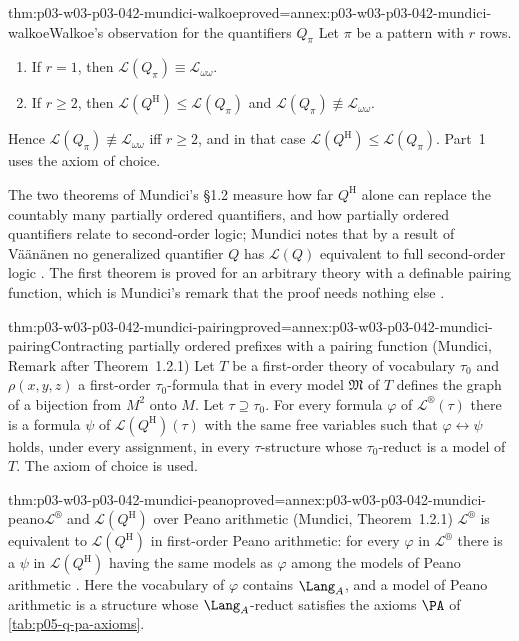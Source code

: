 \begin{hbtheorem}{thm:p03-w03-p03-042-mundici-walkoe}{proved=annex:p03-w03-p03-042-mundici-walkoe}{Walkoe's observation for the quantifiers \(Q_\pi\)}
Let \(\pi\) be a pattern with \(r\) rows.
\begin{enumerate}
\item If \(r=1\), then \(\mathscr L(Q_\pi)\equiv\mathscr L_{\omega\omega}\).
\item If \(r\geq2\), then \(\mathscr L(Q^{\mathrm H})\leq\mathscr
      L(Q_\pi)\) and \(\mathscr L(Q_\pi)\not\equiv\mathscr L_{\omega\omega}\).
\end{enumerate}
Hence \(\mathscr L(Q_\pi)\not\equiv\mathscr L_{\omega\omega}\) iff
\(r\geq2\), and in that case \(\mathscr L(Q^{\mathrm H})\leq\mathscr
L(Q_\pi)\).  Part~1 uses the axiom of choice.
\end{hbtheorem}

The two theorems of Mundici's \S1.2 measure how far \(Q^{\mathrm H}\)
alone can replace the countably many partially ordered quantifiers, and how
partially ordered quantifiers relate to second-order logic; Mundici notes
that by a result of V\"a\"an\"anen no generalized quantifier \(Q\) has
\(\mathscr L(Q)\) equivalent to full second-order logic
\cite[p.~214]{Mundici1985OtherQuantifiers}.  The first theorem is proved
for an arbitrary theory with a definable pairing function, which is
Mundici's remark that the proof needs nothing else
\cite[p.~214]{Mundici1985OtherQuantifiers}.

\begin{hbtheorem}{thm:p03-w03-p03-042-mundici-pairing}{proved=annex:p03-w03-p03-042-mundici-pairing}{Contracting partially ordered prefixes with a pairing function (Mundici, Remark after Theorem~1.2.1)}
Let \(T\) be a first-order theory of vocabulary \(\tau_0\) and
\(\rho(x,y,z)\) a first-order \(\tau_0\)-formula that in every model
\(\mathfrak M\) of \(T\) defines the graph of a bijection from \(M^2\)
onto \(M\).  Let \(\tau\supseteq\tau_0\).  For every formula \(\varphi\) of
\(\mathscr L^{\circledR}(\tau)\) there is a formula \(\psi\) of
\(\mathscr L(Q^{\mathrm H})(\tau)\) with the same free variables such that
\(\varphi\leftrightarrow\psi\) holds, under every assignment, in every
\(\tau\)-structure whose \(\tau_0\)-reduct is a model of \(T\).  The axiom
of choice is used.
\end{hbtheorem}

\begin{hbcorollary}{thm:p03-w03-p03-042-mundici-peano}{proved=annex:p03-w03-p03-042-mundici-peano}{\(\mathscr L^{\circledR}\) and \(\mathscr L(Q^{\mathrm H})\) over Peano arithmetic (Mundici, Theorem~1.2.1)}
\(\mathscr L^{\circledR}\) is equivalent to \(\mathscr L(Q^{\mathrm H})\)
in first-order Peano arithmetic: for every \(\varphi\) in
\(\mathscr L^{\circledR}\) there is a \(\psi\) in \(\mathscr L(Q^{\mathrm
H})\) having the same models as \(\varphi\) among the models of Peano
arithmetic \cite[p.~214]{Mundici1985OtherQuantifiers}.  Here the
vocabulary of \(\varphi\) contains \(\Lang_A\), and a model of Peano
arithmetic is a structure whose \(\Lang_A\)-reduct satisfies the axioms
\(\PA\) of \cref{tab:p05-q-pa-axioms}.
\end{hbcorollary}

